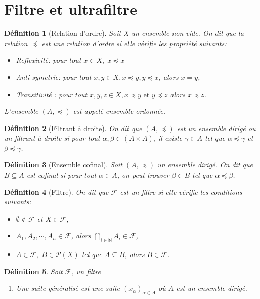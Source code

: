 \documentclass[a4paper, 12pt]{report}
\theoremstyle{break}
\newtheorem{defin}{Définition}[section]
\begin{document}
\section{Filtre et ultrafiltre}
\begin{defin}[Relation d'ordre]
       Soit X un ensemble non vide. On dit que la relation $\preccurlyeq$ est une relation d'ordre si elle vérifie les propriété suivants:
       \begin{itemize}
              \item Reflexivité: pour tout $x \in X, \; x \preccurlyeq x$
              \item Anti-symetrie:  pour tout $x, y \in X, x \preccurlyeq y, y \preccurlyeq x$, alors $x=y$,
              \item Transitivité : pour tout $x,y,z \in X, x \preccurlyeq y \mbox{ et } y \preccurlyeq z$ alors $x \preccurlyeq z$.
       \end{itemize}
       L'ensemble $(A, \preccurlyeq)$ est appelé ensemble ordonnée.
\end{defin}

\begin{defin}[Filtrant à droite]
        On dit que $(A, \preccurlyeq)$ est un ensemble dirigé ou un filtrant à droite si pour tout $\alpha, \beta \in (A \times A)$, il existe $\gamma \in A$ tel que $\alpha \preccurlyeq \gamma$ et $\beta \preccurlyeq \gamma$.
\end{defin}

\begin{defin}[Ensemble cofinal]
      Soit $(A, \preccurlyeq)$ un ensemble dirigé. On dit que $B \subseteq A$ est cofinal si pour tout $\alpha \in A$, on peut trouver $\beta \in B$ tel que $\alpha \preccurlyeq \beta$.
\end{defin}

\begin{defin}[Filtre]
       On dit que $\mathcal{F}$ est un filtre si elle vérifie les conditions suivants:
       \begin{itemize}
             \item $\emptyset \not\in \mathcal{F}$ et $X \in \mathcal{F}$,
             \item $A_{1}, A_{2}, \cdots, A_{n} \in \mathcal{F}$, alors $\displaystyle \bigcap_{i \in \mathbb{N}} A_{i} \in \mathcal{F}$,
             \item $A \in \mathcal{F}, \; B \in \mathcal{P}(X)$ tel que $A \subseteq B$, alors $B \in \mathcal{F}$.
       \end{itemize}
\end{defin}

\begin{defin}
Soit $\mathcal{F}$, un filtre
\begin{enumerate}
      \item Une suite généralisé est une suite $(x_{\alpha})_{\alpha \in A}$ où $A$ est un ensemble dirigé.
\end{enumerate}
\end{defin}
\end{document}

